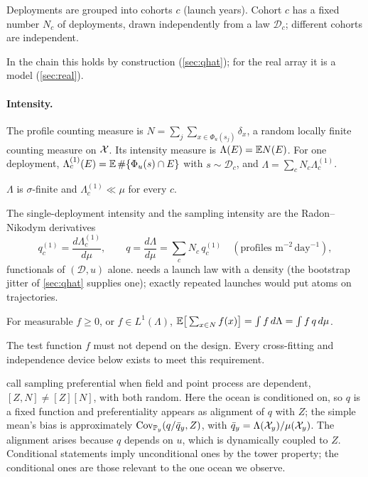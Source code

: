 \begin{assumption}\label{ass:deploy}
Deployments are grouped into cohorts $c$ (launch years). Cohort $c$ has a fixed number $N_c$ of
deployments, drawn independently from a law $\mathcal D_c$; different cohorts are independent.
\end{assumption}

In the chain this holds by construction (\cref{sec:qhat}); for the real array it is a model
(\cref{sec:real}).

\paragraph{Intensity.} The profile counting measure is $N=\sum_j\sum_{x\in\Phi_u(s_j)}\delta_x$, a
random locally finite counting measure on $\mathcal{X}$. Its intensity measure is $\Lambda(E)=\mathbb{E} N(E)$. For one
deployment, $\Lambda^{(1)}_c(E)=\mathbb{E}\,\#\{\Phi_u(s)\cap E\}$ with $s\sim\mathcal D_c$, and
$\Lambda=\sum_cN_c\Lambda^{(1)}_c$.

\begin{assumption}\label{ass:ac}
$\Lambda$ is $\sigma$-finite and $\Lambda^{(1)}_c\ll\mu$ for every $c$.
\end{assumption}

The single-deployment intensity and the sampling intensity are the Radon--Nikodym derivatives
\[
  q^{(1)}_c=\frac{d\Lambda^{(1)}_c}{d\mu},\qquad q=\frac{d\Lambda}{d\mu}=\sum_cN_c\,q^{(1)}_c
  \quad(\text{profiles m}^{-2}\,\text{day}^{-1}),
\]
functionals of $(\mathcal D,u)$ alone.  needs a launch law with a density (the bootstrap
jitter of \cref{sec:qhat} supplies one); exactly repeated launches would put atoms on trajectories.

\begin{lemma}\label{lem:campbell}
For measurable $f\ge0$, or $f\in L^1(\Lambda)$,
$\mathbb{E}\big[\sum_{x\in N}f(x)\big]=\int f\,d\Lambda=\int f\,q\,d\mu$.
\end{lemma}

The test function $f$ must not depend on the design. Every cross-fitting and independence device
below exists to meet this requirement.

\begin{remark}\label{rem:diggle}
\citet{diggle2010} call sampling preferential when field and point process are dependent,
$[Z,N]\neq[Z][N]$, with both random. Here the ocean is conditioned on, so $q$ is a fixed function and
preferentiality appears as alignment of $q$ with $Z$; the simple mean's bias is approximately
$\operatorname{Cov}_{\mathbb{P}_y}(q/\bar q_y,Z)$, with $\bar q_y=\Lambda(\mathcal{X}_y)/\mu(\mathcal{X}_y)$. The alignment arises because
$q$ depends on $u$, which is dynamically coupled to $Z$. Conditional statements imply unconditional
ones by the tower property; the conditional ones are those relevant to the one ocean we observe.
\end{remark}

